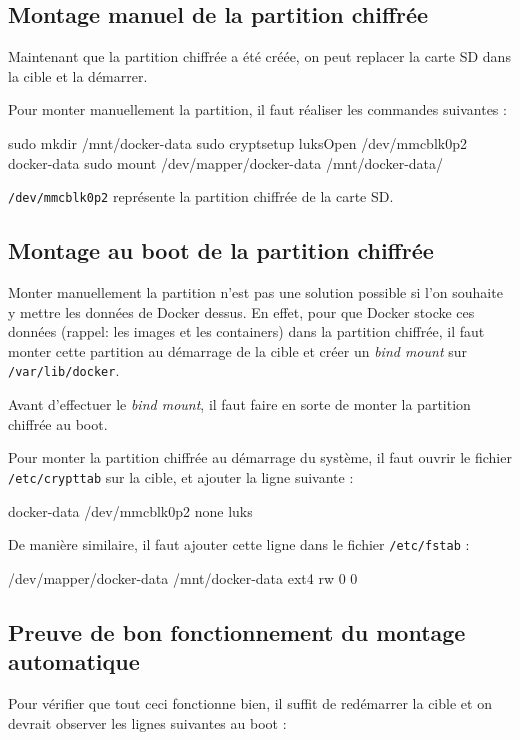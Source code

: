 \documentclass[11pt,a4paper,oneside]{report}
\newcommand{\code}[1]{\texttt{#1}}
\begin{document}
\subsection{Montage manuel de la partition chiffrée}
Maintenant que la partition chiffrée a été créée, on peut replacer la carte SD dans la cible et la démarrer.

Pour monter manuellement la partition, il faut réaliser les commandes suivantes :
\begin{bashcode}
sudo mkdir /mnt/docker-data
sudo cryptsetup luksOpen /dev/mmcblk0p2 docker-data
sudo mount /dev/mapper/docker-data /mnt/docker-data/
\end{bashcode}

\code{/dev/mmcblk0p2} représente la partition chiffrée de la carte SD.

\subsection{Montage au boot de la partition chiffrée}
Monter manuellement la partition n'est pas une solution possible si l'on souhaite y mettre les données de Docker dessus. En effet, pour que Docker stocke ces données (rappel: les images et les containers) dans la partition chiffrée, il faut monter cette partition au démarrage de la cible et créer un \textit{bind mount} sur \code{/var/lib/docker}.


Avant d'effectuer le \textit{bind mount}, il faut faire en sorte de monter la partition chiffrée au boot.


Pour monter la partition chiffrée au démarrage du système, il faut ouvrir le fichier \code{/etc/crypttab} sur la cible, et ajouter la ligne suivante :
\begin{bashcode}
docker-data /dev/mmcblk0p2  none luks
\end{bashcode}

De manière similaire, il faut ajouter cette ligne dans le fichier \code{/etc/fstab} :
\begin{bashcode}
/dev/mapper/docker-data /mnt/docker-data ext4 rw 0 0
\end{bashcode}


\subsection{Preuve de bon fonctionnement du montage automatique}
Pour vérifier que tout ceci fonctionne bien, il suffit de redémarrer la cible et on devrait observer les lignes suivantes au boot :
\end{document}
